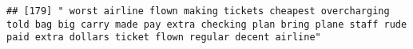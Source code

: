 \documentclass[
]{article}
\begin{document}
\begin{verbatim}
## [179] " worst airline flown making tickets cheapest overcharging told bag big carry made pay extra checking plan bring plane staff rude paid extra dollars ticket flown regular decent airline"                                                                                                                                                                                                                                                                                                                                                                                                                                                                                                                                                                                                                                                                                                                                                                                                                                                                                                                                                                                                                                                                                                                                                                                                                                                                                                                                                                                                                                                                                                                                                                                                       

\end{verbatim}
\end{document}
